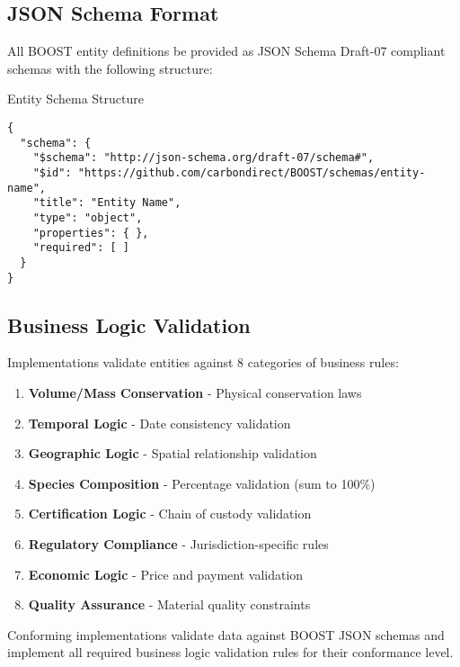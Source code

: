 
\subsection{JSON Schema Format}
\label{sec:json-schema-format}

All BOOST entity definitions \MUST{} be provided as JSON Schema Draft-07 compliant schemas with the following \REQUIRED{} structure:

\begin{jsonexample}{Entity Schema Structure}
\begin{verbatim}
{
  "schema": {
    "$schema": "http://json-schema.org/draft-07/schema#",
    "$id": "https://github.com/carbondirect/BOOST/schemas/entity-name",
    "title": "Entity Name",
    "type": "object",
    "properties": { },
    "required": [ ]
  }
}
\end{verbatim}
\end{jsonexample}

\subsection{Business Logic Validation}
\label{sec:business-logic}

Implementations \MUST{} validate entities against 8 categories of business rules:

\begin{enumerate}
    \item \textbf{Volume/Mass Conservation} - Physical conservation laws
    \item \textbf{Temporal Logic} - Date consistency validation
    \item \textbf{Geographic Logic} - Spatial relationship validation
    \item \textbf{Species Composition} - Percentage validation (sum to 100\%)
    \item \textbf{Certification Logic} - Chain of custody validation
    \item \textbf{Regulatory Compliance} - Jurisdiction-specific rules
    \item \textbf{Economic Logic} - Price and payment validation
    \item \textbf{Quality Assurance} - Material quality constraints
\end{enumerate}

\begin{normative}[title=Validation Requirements]
Conforming implementations \MUST{} validate data against BOOST JSON schemas and implement all required business logic validation rules for their conformance level.
\end{normative}